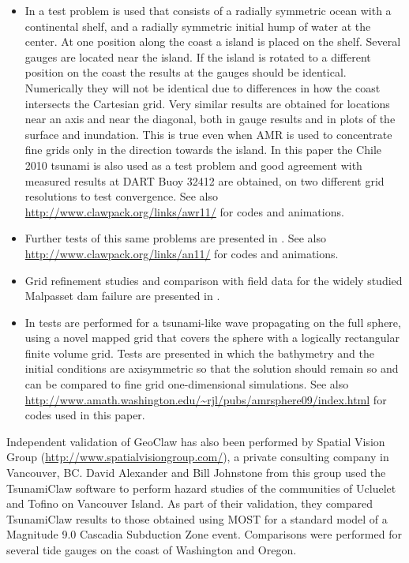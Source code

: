 \begin{itemize}
\item In \cite{BergerGeorgeLeVequeMandli:awr11} a test problem is used that
consists of a radially symmetric ocean with a continental shelf, and
a radially symmetric initial
hump of water at the center.  At one position along the coast a 
island is placed on the shelf.  Several gauges are located near the island.
If the island is rotated to a different position on the coast the results at
the gauges should be identical.  Numerically they will not be identical due
to differences in how the coast intersects the Cartesian grid.  Very similar
results are obtained for locations near an axis and near the diagonal, both
in gauge results and in plots of the surface and inundation.  This is true
even when AMR is used to concentrate fine grids only in the direction
towards the island.  In this paper the Chile 2010 tsunami is also used as a
test problem and good agreement with measured results at DART Buoy 32412
are obtained, on two different grid resolutions to test convergence.
See also 
\url{http://www.clawpack.org/links/awr11/}
for codes and animations.


\item Further tests of this same problems are presented in
\cite{LeVequeGeorgeBerger:an11}.  
See also 
\url{http://www.clawpack.org/links/an11/}
for codes and animations.

\item Grid refinement studies and comparison with field data for the widely
studied Malpasset dam failure are presented in \cite{George:Malpasset}.

\item In \cite{mjb-dac-ch-rjl:amrsphere09} tests are performed for a
tsunami-like wave propagating on the full sphere, using a novel mapped grid
that covers the sphere with a logically rectangular finite volume grid.
Tests are presented in which the bathymetry and the initial conditions are
axisymmetric so that the solution should remain so and can be compared to
fine grid one-dimensional simulations.  
See also 
\url{http://www.amath.washington.edu/~rjl/pubs/amrsphere09/index.html}
for codes used in this paper.
\end{itemize} 


Independent validation of GeoClaw has also been performed by Spatial Vision
Group (\url{http://www.spatialvisiongroup.com/}), a private consulting
company in Vancouver, BC. David Alexander and Bill Johnstone from this group
used the  TsunamiClaw software to perform hazard
studies of the communities of Ucluelet and Tofino on Vancouver Island.  As
part of their validation, they compared  TsunamiClaw results to those obtained
using MOST for a standard model of a Magnitude 9.0 
Cascadia Subduction Zone event.  Comparisons were performed for several tide
gauges on the coast of Washington and Oregon.


